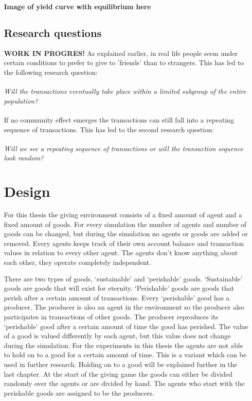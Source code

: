\documentclass[twoside,openright]{uva-bachelor-thesis}
\begin{document}
\textbf{Image of yield curve with equilibrium here}

\section{Research questions}
\textbf{WORK IN PROGRES!}
As explained earlier, in real life people seem under certain conditions to prefer to give to 'friends' than to strangers. This has led to the following research question:
\\
\\
\textit{Will the transactions eventually take place within a limited subgroup of the entire population?}
\\
\\
If no community effect emerges the transactions can still fall into a repeating sequence of transactions. This has led to the second research question:
\\
\\
\textit{Will we see a repeating sequence of transactions or will the transaction sequence look random?}


\chapter{Design}
For this thesis the giving environment consists of a fixed amount of agent and a fixed amount of goods. For every simulation the number of agents and number of goods can be changed, but during the simulation no agents or goods are added or removed.  Every agents keeps track of their own account balance and transaction values in relation to every other agent. The agents don’t know anything about each other, they operate completely independent.

There are two types of goods, ‘sustainable’ and ‘perishable’ goods. ‘Sustainable’ goods are goods that will exist for eternity. ‘Perishable’ goods are goods that perish after a certain amount of transactions. Every ‘perishable’ good has a producer. The producer is also an agent in the environment so the producer also participates in transactions of other goods. The producer reproduces its ‘perishable’ good after a certain amount of time the good has perished. The value of a good is valued differently by each agent, but this value does not change during the simulation. For the experiments in this thesis the agents are not able to hold on to a good for a certain amount of time. This is a variant which can be used in further research. Holding on to a good will be explained further in the last chapter. At the start of the giving game the goods can either be divided randomly over the agents or are divided by hand. The agents who start with the perishable goods are assigned to be the producers.
\end{document}
